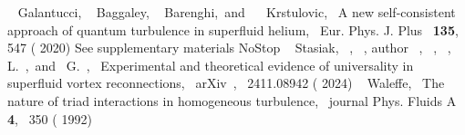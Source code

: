 \documentclass[%
 reprint,
 amsmath,amssymb,
 aps,
 prl,
]{revtex4-2}
\begin{document}
{\begin{thebibliography}{61}
       { {~\bibnamefont
      {Galantucci}},  {\ \bibnamefont
      {Baggaley}},  {\ \bibnamefont
      {Barenghi}},\ and\  {~\bibnamefont
      {Krstulovic}},\ } { {A new self-consistent
      approach of quantum turbulence in superfluid helium},\ }\href@noop {}
      { { {Eur. Phys. J. Plus}\ }\textbf
      { {135}},\  {547} (
      {2020})}%
      \BibitemOpen
      \href@noop {} { {See supplementary materials}}\BibitemShut
      {NoStop}%
      \BibitemOpen
       { {\ \bibnamefont
      {Stasiak}},  {~},
       {~}, \bibinfo
      {author} {\ }, 
      {\ }, 
      {~},  {\bibfnamefont
      {L.}~},\ and\  {\bibfnamefont
      {G.}~},\ } {
      {Experimental and theoretical evidence of universality in superfluid vortex
      reconnections},\ }\href@noop {} { {
      {arXiv}\ ,\  {2411.08942}} (
      {2024})}%
      \BibitemOpen
       { {~\bibnamefont
      {Waleffe}},\ } { {The nature of triad
      interactions in homogeneous turbulence},\ }\href@noop {} {\bibfield
      {journal} { {Phys. Fluids A}\ }\textbf {
      {4}},\  {350} ( {1992})}%

\end{thebibliography}}
\end{document}
